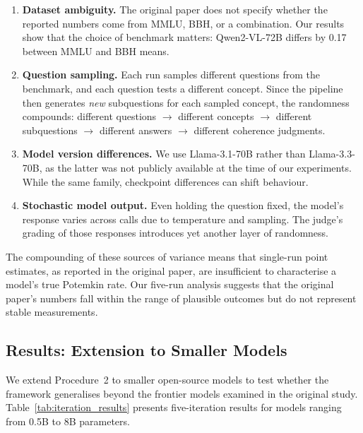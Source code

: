 \documentclass[sigconf,authordraft]{acmart}
\begin{document}
\begin{enumerate}
    \item \textbf{Dataset ambiguity.} The original paper does not specify whether the reported numbers come from MMLU, BBH, or a combination. Our results show that the choice of benchmark matters: Qwen2-VL-72B differs by 0.17 between MMLU and BBH means.
    \item \textbf{Question sampling.} Each run samples different questions from the benchmark, and each question tests a different concept. Since the pipeline then generates \emph{new} subquestions for each sampled concept, the randomness compounds: different questions $\to$ different concepts $\to$ different subquestions $\to$ different answers $\to$ different coherence judgments.
    \item \textbf{Model version differences.} We use Llama-3.1-70B rather than Llama-3.3-70B, as the latter was not publicly available at the time of our experiments. While the same family, checkpoint differences can shift behaviour.
    \item \textbf{Stochastic model output.} Even holding the question fixed, the model's response varies across calls due to temperature and sampling. The judge's grading of those responses introduces yet another layer of randomness.
\end{enumerate}

The compounding of these sources of variance means that single-run point estimates, as reported in the original paper, are insufficient to characterise a model's true Potemkin rate. Our five-run analysis suggests that the original paper's numbers fall within the range of plausible outcomes but do not represent stable measurements.

\subsection{Results: Extension to Smaller Models}
\label{sec:smaller-models}

We extend Procedure~2 to smaller open-source models to test whether the framework generalises beyond the frontier models examined in the original study. Table~\ref{tab:iteration_results} presents five-iteration results for models ranging from 0.5B to 8B parameters.
\end{document}
